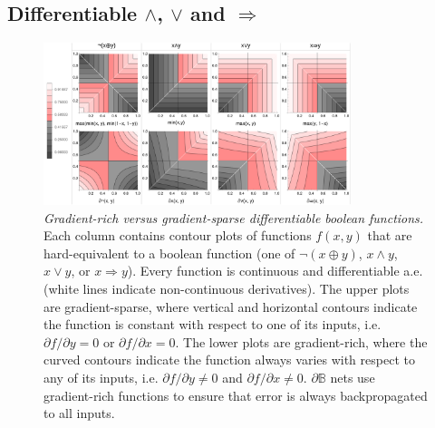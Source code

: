 \documentclass{article}
\theoremstyle{plain}
\theoremstyle{definition}
\theoremstyle{remark}
\begin{document}
\subsection{Differentiable $\wedge$, $\vee$ and $\Rightarrow$}

\begin{figure}[t!]
	\centering
	\includegraphics[trim=0pt 0pt 0pt 0pt, clip, width=0.8\textwidth]{../logic-gates.png}
	\caption{{\em Gradient-rich versus gradient-sparse differentiable boolean functions.} Each column contains contour plots of functions $f(x,y)$ that are hard-equivalent to a boolean function (one of $\neg(x \oplus y)$, $x \wedge y$, $x \vee y$, or $x \Rightarrow y$). Every function is continuous and differentiable a.e. (white lines indicate non-continuous derivatives). The upper plots are gradient-sparse, where vertical and horizontal contours indicate the function is constant with respect to one of its inputs, i.e. $\partial f/\partial y = 0$ or $\partial f/\partial x = 0$. The lower plots are gradient-rich, where the curved contours indicate the function always varies with respect to any of its inputs, i.e. $\partial f/\partial y \neq 0$ and $\partial f/\partial x \neq 0$. $\partial \mathbb{B}$ nets use gradient-rich functions to ensure that error is always backpropagated to all inputs.} 
	\label{fig:gradient-rich}
\end{figure}
\end{document}
